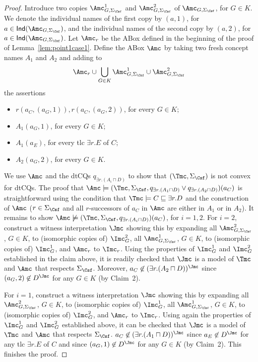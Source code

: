 \documentclass{lmcs}
\theoremstyle{definition}
\begin{document}
\begin{proof}
Introduce two copies $\Amc_{G,\Sigma_\Csf}^{1}$ and $\Amc_{G,\Sigma_\Csf}^{2}$
of $\Amc_{G,\Sigma_\Csf}$, for $G\in K$.  We denote the individual names of the
first copy by $(a,1)$, for $a\in {\sf Ind}(\Amc_{G,\Sigma_\Csf})$, and the
individual names of the second copy by $(a,2)$, for $a\in {\sf Ind}(\Amc_{G,\Sigma_\Csf})$. 
Let $\Amc_{r}$ be the ABox defined in the beginning of the proof of Lemma~\ref{lem:point1case1}. 
Define the ABox $\Amc$ by taking two fresh concept names $A_{1}$ and $A_{2}$ and adding
to
$$
\Amc_{r} \cup \bigcup_{G\in K}\Amc_{G,\Sigma_\Csf}^{1} \cup
\Amc_{G,\Sigma_\Csf}^{2}
$$
the assertions
\begin{itemize}
\item $r(a_{C},(a_{G},1)),r(a_{C},(a_{G},2))$, for every $G\in K$;
\item $A_{1}(a_{G},1)$, for every $G\in K$;
\item $A_{1}(a_{E})$, for every tlc $\exists r.E$ of $C$;
\item $A_{2}(a_{G},2)$, for every $G\in K$.
\end{itemize}
We use $\Amc$ and the dtCQs $q_{\exists r.(A_{i}\sqcap D)}$ to show that $(\Tmc,\Sigma_{\Csf})$ is not convex for dtCQs.
The proof that $\Amc\models (\Tmc,\Sigma_\Csf,q_{\exists r.(A_{1}\sqcap D)}\vee q_{\exists r.(A_{2}\sqcap D)})(a_{C})$ is straightforward
using the condition that $\Tmc\models C \sqsubseteq \exists r.D$ and the construction of $\Amc$ ($r\in \Sigma_{\Csf}$ and all $r$-successors
of $a_{C}$ in $\Amc$ are either in $A_{1}$ or in $A_{2}$).
It remains to show $\Amc\not\models (\Tmc,\Sigma_\Csf,q_{\exists r.(A_{i}\sqcap D)})(a_{C})$, for $i=1,2$.
For $i=2$, construct a witness interpretation $\Jmc$ showing this 
by expanding all $\Amc_{G,\Sigma_\Csf}^{2}$, $G\in K$, to
(isomorphic copies of) $\Imc_{G}^{2}$, all $\Amc_{G,\Sigma_\Csf}^{1}$, $G\in K$, to (isomorphic copies of) $\Imc_{G}^{1}$, and
$\Amc_{r}$ to $\Imc_{r}$. Using the properties of $\Imc_{G}^{1}$ and
$\Imc_{G}^{2}$ established in the claim above, it is readily checked that $\Jmc$ is a
model of $\Tmc$ and $\Amc$ that respects $\Sigma_\Csf$. Moreover, $a_{C}\not\in (\exists r.(A_{2}\sqcap D))^{\Jmc}$ 
since $(a_{G},2)\not\in D^{\Jmc}$ for any $G\in K$ (by Claim~2).
  
For $i=1$, construct a witness interpretation $\Jmc$ showing this by
expanding all $\Amc_{G,\Sigma_\Csf}^{2}$, $G\in K$, to (isomorphic copies of) $\Imc_{G}^{1}$, 
all $\Amc_{G,\Sigma_\Csf}^{1}$, $G\in K$, to (isomorphic copies of) $\Imc_{G}^{2}$, and $\Amc_{r}$ to $\Imc_{r}$.
Using again the properties of $\Imc_{G}^{1}$ and $\Imc_{G}^{2}$ established above, it can
be checked that $\Jmc$ is a model of $\Tmc$ and $\Amc$ that respects $\Sigma_\Csf$. 
$a_{C}\not\in (\exists r.(A_{1}\sqcap D))^{\Jmc}$ since $a_{E}\not\in D^{\Jmc}$ for any tlc $\exists r.E$ of 
$C$ and since $(a_{G},1)\not\in D^{\Jmc}$ for any $G\in K$ (by Claim~2).
This finishes the proof.
\end{proof}
\end{document}

